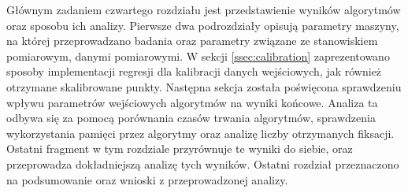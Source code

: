 Głównym zadaniem czwartego rozdziału jest przedstawienie wyników algorytmów oraz sposobu ich analizy. Pierwsze dwa podrozdziały opisują parametry maszyny, na której przeprowadzano badania oraz parametry związane ze stanowiskiem pomiarowym, danymi pomiarowymi. W sekcji \ref{ssec:calibration} zaprezentowano sposoby implementacji regresji dla kalibracji danych wejściowych, jak również otrzymane skalibrowane punkty. Następna sekcja została poświęcona sprawdzeniu wpływu parametrów wejściowych algorytmów na wyniki końcowe. Analiza ta odbywa się za pomocą porównania czasów trwania algorytmów, sprawdzenia wykorzystania pamięci przez algorytmy oraz analizę liczby otrzymanych fiksacji. Ostatni fragment w tym rozdziale przyrównuje te wyniki do siebie, oraz przeprowadza dokładniejszą analizę tych wyników. Ostatni rozdział przeznaczono na podsumowanie oraz wnioski z przeprowadzonej analizy.
